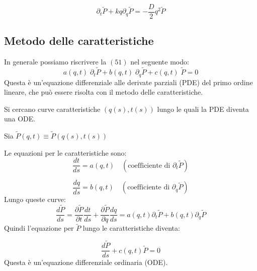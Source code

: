 \begin{equation}
\partial_t \tilde{P} + kq \partial_q \tilde{P} = -\frac{D}{2}q^2 \tilde{P}
\end{equation}

 \subsection{Metodo delle caratteristiche}

In generale possiamo riscrivere la $(51)$ nel seguente modo:
\begin{equation}
a (q, t) \; \partial_t \tilde{P} + b(q,t) \; \partial_q \tilde{P} + c(q, t)\; \tilde{P} =0
\end{equation}
Questa è un'equazione differenziale alle derivate parziali (PDE) del primo ordine lineare, che può essere risolta con il metodo delle caratteristiche. 

Si cercano curve caratteristiche $(q(s), t(s))$ lungo le quali la PDE diventa una ODE.

Sia $\tilde{P}(q,t) \equiv \tilde{P}(q(s), t(s))$

Le equazioni per le caratteristiche sono:
\begin{equation}
\frac{dt}{ds} = a(q, t) \quad (\text{coefficiente di } \partial_t \tilde{P})
\end{equation}

\begin{equation}
\frac{dq}{ds} = b(q,t) \quad (\text{coefficiente di } \partial_q \tilde{P})
\end{equation}
Lungo queste curve:
\begin{equation}
\frac{d\tilde{P}}{ds} = \frac{\partial \tilde{P}}{\partial t}\frac{dt}{ds} + \frac{\partial \tilde{P}}{\partial q}\frac{dq}{ds} = a(q,t)\partial_t \tilde{P} + b(q,t)\partial_q \tilde{P}
\end{equation}
Quindi l'equazione per $\tilde{P}$ lungo le caratteristiche diventa:

\begin{equation}
\frac{d\tilde{P}}{ds} + c(q,t)\tilde{P} =0
\end{equation}
Questa è un'equazione differenziale ordinaria (ODE).